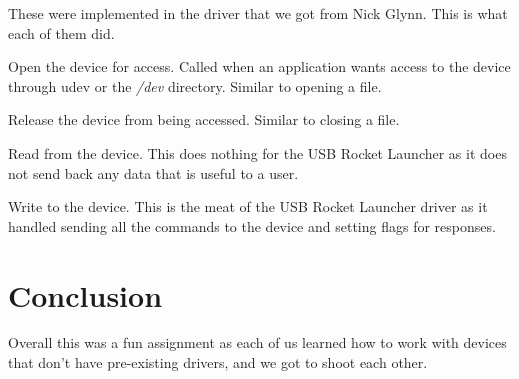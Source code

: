 \documentclass[letterpaper,10pt,titlepage]{article}
\begin{document}
These were implemented in the driver that we got from Nick Glynn. This
is what each of them did.

\begin{description}[style=nextline]

\item[Open]
Open the device for access. Called when an application wants access to
the device through udev or the \emph{/dev} directory. Similar to opening
a file.

\item[Release]
Release the device from being accessed. Similar to closing a file.

\item[Read]
Read from the device. This does nothing for the USB Rocket Launcher as
it does not send back any data that is useful to a user.

\item[Write]
Write to the device. This is the meat of the USB Rocket Launcher driver
as it handled sending all the commands to the device and setting flags
for responses.

\end{description}

\section*{Conclusion}

Overall this was a fun assignment as each of us learned how to work with
devices that don't have pre-existing drivers, and we got to shoot
each other.
\end{document}
